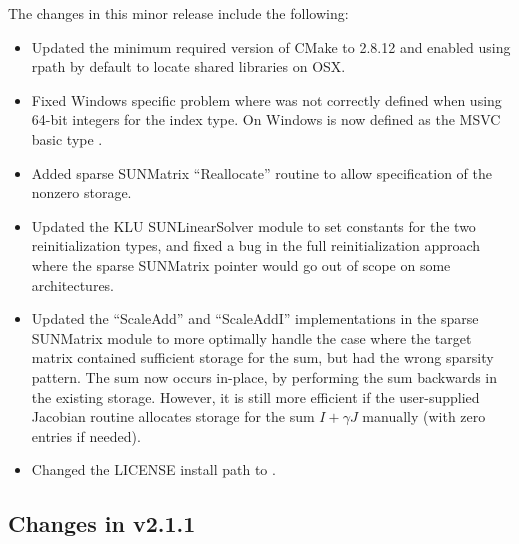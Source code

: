 The changes in this minor release include the following:
\begin{itemize}
\item Updated the minimum required version of CMake to 2.8.12 and enabled
  using rpath by default to locate shared libraries on OSX.
\item Fixed Windows specific problem where  was not correctly 
  defined when using 64-bit integers for the {\sundials} index type. On Windows
   is now defined as the MSVC basic type .
\item Added sparse SUNMatrix ``Reallocate'' routine to allow specification of
  the nonzero storage.
\item Updated the KLU SUNLinearSolver module to set constants for the two
  reinitialization types, and fixed a bug in the full reinitialization
  approach where the sparse SUNMatrix pointer would go out of scope on
  some architectures.
\item Updated the ``ScaleAdd'' and ``ScaleAddI'' implementations in the
  sparse SUNMatrix module to more optimally handle the case where the
  target matrix contained sufficient storage for the sum, but had the
  wrong sparsity pattern.  The sum now occurs in-place, by performing
  the sum backwards in the existing storage.  However, it is still more
  efficient if the user-supplied Jacobian routine allocates storage for
  the sum $I+\gamma J$ manually (with zero entries if needed).
\item Changed the LICENSE install path to .
\end{itemize}

\subsection*{Changes in v2.1.1}

